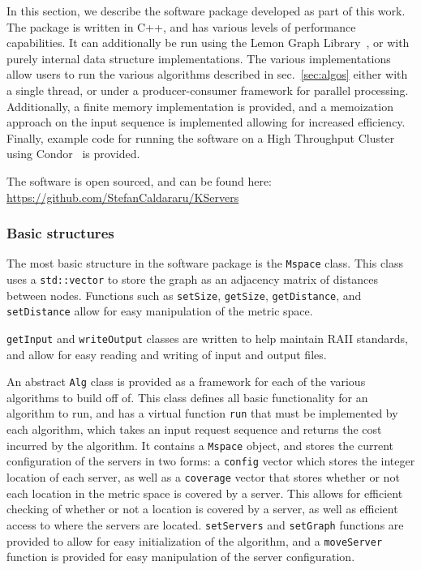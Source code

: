 In this section, we describe the software package developed as part of this work. The package is written in C++, and has various levels of performance capabilities. It can additionally be run using the Lemon Graph Library~\cite{lemon}, or with purely internal data structure implementations. The various implementations allow users to run the various algorithms described in sec.~\ref{sec:algos} either with a single thread, or under a producer-consumer framework for parallel processing. Additionally, a finite memory implementation is provided, and a memoization approach on the input sequence is implemented allowing for increased efficiency. Finally, example code for running the software on a High Throughput Cluster using Condor~\cite{htcondor} is provided.

The software is open sourced, and can be found here: \url{https://github.com/StefanCaldararu/KServers}
\subsubsection*{Basic structures}

The most basic structure in the software package is the \texttt{Mspace} class. This class uses a \texttt{std::vector} to store the graph as an adjacency matrix of distances between nodes. Functions such as \texttt{setSize}, \texttt{getSize}, \texttt{getDistance}, and \texttt{setDistance} allow for easy manipulation of the metric space.

\texttt{getInput} and \texttt{writeOutput} classes are written to help maintain RAII standards, and allow for easy reading and writing of input and output files. 

An abstract \texttt{Alg} class is provided as a framework for each of the various algorithms to build off of. This class defines all basic functionality for an algorithm to run, and has a virtual function \texttt{run} that must be implemented by each algorithm, which takes an input request sequence and returns the cost incurred by the algorithm. It contains a \texttt{Mspace} object, and stores the current configuration of the servers in two forms: a \texttt{config} vector which stores the integer location of each server, as well as a \texttt{coverage} vector that stores whether or not each location in the metric space is covered by a server. This allows for efficient checking of whether or not a location is covered by a server, as well as efficient access to where the servers are located. \texttt{setServers} and \texttt{setGraph} functions are provided to allow for easy initialization of the algorithm, and a \texttt{moveServer} function is provided for easy manipulation of the server configuration.

